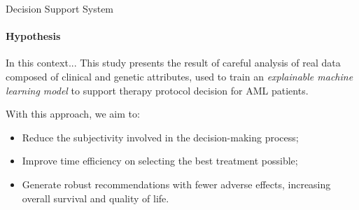 \begin{frame}[fragile]{Decision Support System}
\framesubtitle{Hypothesis}

\begin{block}{In this context...}
This study presents the result of careful analysis of real data composed of clinical and genetic attributes, used to train an \emph{explainable machine learning model} to support therapy protocol decision for AML patients.
\end{block}

With this approach, we aim to: 

\begin{itemize}
    \item Reduce the subjectivity involved in the decision-making process;
    \item Improve time efficiency on selecting the best treatment possible;
    \item Generate robust recommendations with fewer adverse effects, increasing overall survival and quality of life.
\end{itemize}

\end{frame}

